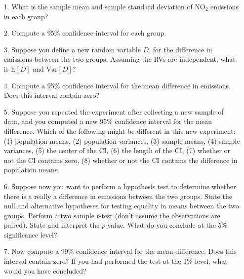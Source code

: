 \documentclass[10pt]{extarticle}
\newcommand{\E}{\text{E}}
\newcommand{\Var}{\text{Var}}
\begin{document}
\begin{itemize}

	\item[1.] What is the sample mean and sample standard deviation of NO$_2$ emissions in each group? \\ 

	\item[2.] Compute a 95\% confidence interval for each group.  \\ 

	\item[3.] Suppose you define a new random variable $D$, for the difference in emissions between the two groups. Assuming the RVs are independent, what is $\E[D]$ and $\Var[D]$? \\ 

	\item[4.] Compute a 95\% confidence interval for the mean difference in emissions. Does this interval contain zero? \\ 

	\item[5.] Suppose you repeated the experiment after collecting a new sample of data, and you computed a new 95\% confidence interval for the mean difference. Which of the following might be different in this new experiment: (1) population means, (2) population variances, (3) sample means, (4) sample variances, (5) the center of the CI, (6) the length of the CI, (7) whether or not the CI contains zero, (8) whether or not the CI contains the difference in population means. \\

	\item[6.] Suppose now you want to perform a hypothesis test to determine whether there is a really a difference in emissions between the two groups. State the null and alternative hypotheses for testing equality in means between the two groups. Perform a two sample $t$-test (don't assume the observations are paired). State and interpret the $p$-value. What do you conclude at the 5\% significance level? \\ 

	\item[7.] Now compute a 99\% confidence interval for the mean difference. Does this interval contain zero? If you had performed the test at the 1\% level, what would you have concluded?  

\end{itemize}

\newpage
\end{document}
